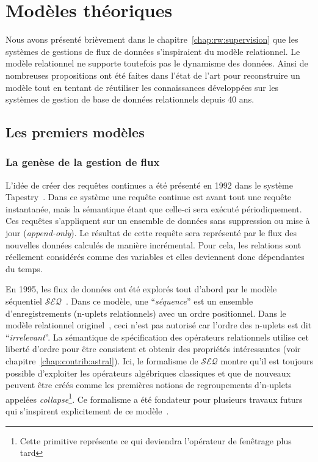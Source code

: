 \section{Modèles théoriques}
Nous avons présenté brièvement dans le chapitre~\ref{chap:rw:supervision} que les systèmes de gestions de flux de données s'inspiraient du modèle relationnel. Le modèle relationnel ne supporte toutefois pas le dynamisme des données. Ainsi de nombreuses propositions ont été faites dans l'état de l'art pour reconstruire un modèle tout en tentant de réutiliser les connaissances développées sur les systèmes de gestion de base de données relationnels depuis 40 ans.


\subsection{Les premiers modèles}

\subsubsection{La genèse de la gestion de flux}
L'idée de créer des requêtes continues a été présenté en 1992 dans le système Tapestry~\cite{Terry:tapestry}. Dans ce système une requête continue est avant tout une requête instantanée, mais la sémantique étant que celle-ci sera exécuté périodiquement. Ces requêtes s'appliquent sur un ensemble de données sans suppression ou mise à jour (\textit{append-only}). Le résultat de cette requête sera représenté par le flux des nouvelles données calculés de manière incrémental. Pour cela, les relations sont réellement considérés comme des variables et elles deviennent donc dépendantes du temps.

En 1995, les flux de données ont été explorés tout d'abord par le modèle séquentiel $\mathcal{SEQ}$~\cite{Seshadri:seq}. Dans ce modèle, une \enquote{\it séquence} est un ensemble d'enregistrements (n-uplets relationnels) avec un ordre positionnel. Dans le modèle relationnel originel~\cite{Codd:model}, ceci n'est pas autorisé car l'ordre des n-uplets est dit \enquote{\it irrelevant}. La sémantique de spécification des opérateurs relationnels utilise cet liberté d'ordre pour être consistent et obtenir des propriétés intéressantes (voir chapitre~\ref{chap:contrib:astral}). Ici, le formalisme de $\mathcal{SEQ}$ montre qu'il est toujours possible d'exploiter les opérateurs algébriques classiques et que de nouveaux peuvent être créés comme les premières notions de regroupements d'n-uplets appelées \textit{collapse}\footnote{Cette primitive représente ce qui deviendra l'opérateur de fenêtrage plus tard}. Ce formalisme a été fondateur pour plusieurs travaux futurs qui s'inspirent explicitement de ce modèle~\cite{Gurgen:sens,Babcock:issues}.

